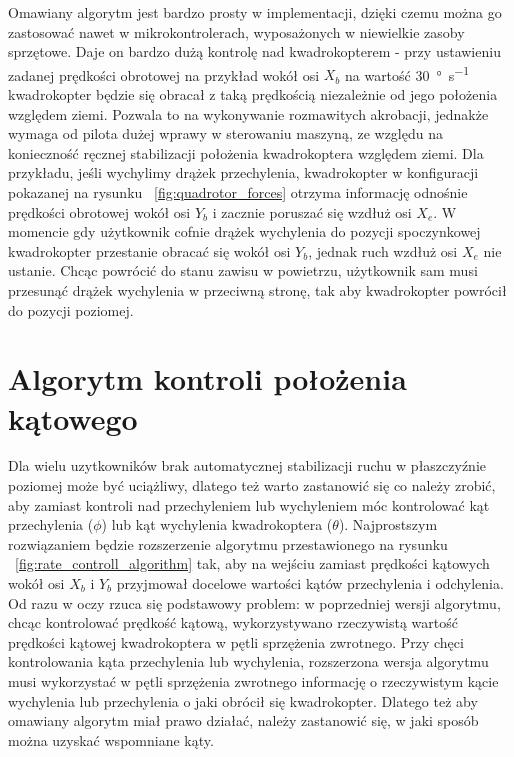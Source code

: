 Omawiany algorytm jest bardzo prosty w implementacji, dzięki czemu można go zastosować nawet w mikrokontrolerach, wyposażonych w niewielkie zasoby sprzętowe. Daje on bardzo dużą kontrolę nad kwadrokopterem - przy ustawieniu zadanej prędkości obrotowej na przykład wokół osi $X_b$ na wartość \SI{30}{\degree\per\second} kwadrokopter będzie się obracał z taką prędkością niezależnie od jego położenia względem ziemi. Pozwala to na wykonywanie rozmawitych akrobacji, jednakże wymaga od pilota dużej wprawy w sterowaniu maszyną, ze względu na konieczność ręcznej stabilizacji położenia kwadrokoptera względem ziemi. Dla przykładu, jeśli wychylimy drążek przechylenia, kwadrokopter w konfiguracji pokazanej na rysunku  ~\ref{fig:quadrotor_forces} otrzyma informację odnośnie prędkości obrotowej wokół osi $Y_b$ i zacznie poruszać się wzdłuż osi $X_e$. W momencie gdy użytkownik cofnie drążek wychylenia do pozycji spoczynkowej kwadrokopter przestanie obracać się  wokół osi $Y_b$, jednak ruch wzdłuż osi $X_e$ nie ustanie. Chcąc powrócić do stanu zawisu w powietrzu, użytkownik sam musi przesunąć drążek wychylenia w przeciwną stronę, tak aby kwadrokopter powrócił do pozycji poziomej. 

\section{Algorytm kontroli położenia kątowego}

Dla wielu uzytkowników brak automatycznej stabilizacji ruchu w płaszczyźnie poziomej może być uciążliwy, dlatego też warto zastanowić się co należy zrobić, aby zamiast kontroli nad przechyleniem lub wychyleniem móc kontrolować kąt przechylenia ($\phi$) lub kąt wychylenia kwadrokoptera ($\theta$). Najprostszym rozwiązaniem będzie rozszerzenie algorytmu przestawionego na rysunku ~\ref{fig:rate_controll_algorithm} tak, aby na wejściu zamiast prędkości kątowych wokół osi $X_b$ i $Y_b$ przyjmował docelowe wartości kątów przechylenia i odchylenia. Od razu w oczy rzuca się podstawowy problem: w poprzedniej wersji algorytmu, chcąc kontrolować prędkość kątową, wykorzystywano rzeczywistą wartość prędkości kątowej kwadrokoptera w pętli sprzężenia zwrotnego. Przy chęci kontrolowania kąta przechylenia lub wychylenia, rozszerzona wersja algorytmu musi wykorzystać w pętli sprzężenia zwrotnego informację o rzeczywistym kącie wychylenia lub przechylenia o jaki obrócił się kwadrokopter. Dlatego też aby omawiany algorytm miał prawo działać, należy zastanowić się, w jaki sposób można uzyskać wspomniane kąty.  

